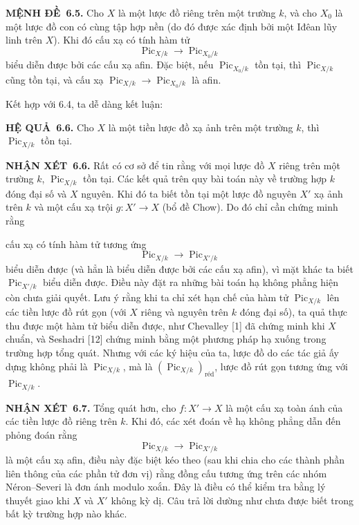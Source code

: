 \documentclass[11pt,twoside,openany]{book}
\numberwithin{equation}{section}
\newcommand{\src}[1]{%
  \phantomsection\hypertarget{src:\fgasourceid:#1}{}%
  \marginpar{\raggedleft\footnotesize\sffamily #1}%
}
\newcommand{\fgasourceid}{unset}
\newcommand{\result}[2]{\par\medskip\noindent\textbf{#1\if\relax\detokenize{#2}\relax\else\ #2\fi.}\quad}
\begin{document}
\result{MỆNH ĐỀ}{6.5} Cho $X$ là một lược đồ riêng trên một trường $k$, và cho
$X_0$ là một lược đồ con có cùng tập hợp nền (do đó được xác định bởi một Iđêan
lũy linh trên $X$). Khi đó cấu xạ có tính hàm tử
\[
\operatorname{Pic}_{X/k}\longrightarrow\operatorname{Pic}_{X_0/k}
\]
biểu diễn được bởi các cấu xạ afin. Đặc biệt, nếu
$\operatorname{Pic}_{X_0/k}$ tồn tại, thì $\operatorname{Pic}_{X/k}$ cũng tồn
tại, và cấu xạ
$\operatorname{Pic}_{X/k}\longrightarrow\operatorname{Pic}_{X_0/k}$ là afin.

Kết hợp với 6.4, ta dễ dàng kết luận:

\result{HỆ QUẢ}{6.6} Cho $X$ là một tiền lược đồ xạ ảnh trên một trường $k$,
thì $\operatorname{Pic}_{X/k}$ tồn tại.

\result{NHẬN XÉT}{6.6} Rất có cơ sở để tin rằng với mọi lược đồ $X$ riêng trên
một trường $k$, $\operatorname{Pic}_{X/k}$ tồn tại. Các kết quả trên
quy bài toán này về trường hợp $k$ đóng đại số và $X$ nguyên. Khi đó ta biết
tồn tại một lược đồ nguyên $X'$ xạ ảnh trên $k$ và một cấu xạ trội
$g:X'\longrightarrow X$ (bổ đề Chow). Do đó chỉ cần chứng minh rằng
\src{160}
cấu xạ có tính hàm tử tương ứng
\[
\operatorname{Pic}_{X/k}\longrightarrow\operatorname{Pic}_{X'/k}
\]
biểu diễn được (và hẳn là biểu diễn được bởi các cấu xạ afin), vì mặt khác ta
biết $\operatorname{Pic}_{X'/k}$ biểu diễn được. Điều này đặt ra những bài toán
hạ không phẳng hiện còn chưa giải quyết. Lưu ý rằng khi ta chỉ xét hạn chế của
hàm tử $\operatorname{Pic}_{X/k}$ lên các tiền lược đồ rút gọn (với $X$ riêng
và nguyên trên $k$ đóng đại số), ta quả thực thu được một hàm tử biểu diễn
được, như Chevalley [1] đã chứng minh khi $X$ chuẩn, và Seshadri [12] chứng minh
bằng một phương pháp hạ xuống trong trường hợp tổng quát. Nhưng với các ký hiệu
của ta, lược đồ do các tác giả ấy dựng không phải là
$\operatorname{Pic}_{X/k}$, mà là
$(\operatorname{Pic}_{X/k})_{\mathrm{réd}}$, lược đồ rút gọn tương ứng với
$\operatorname{Pic}_{X/k}$.

\result{NHẬN XÉT}{6.7} Tổng quát hơn, cho $f:X'\longrightarrow X$ là một cấu
xạ toàn ánh của các tiền lược đồ riêng trên $k$. Khi đó, các xét đoán về hạ
không phẳng dẫn đến phỏng đoán rằng
\[
\operatorname{Pic}_{X/k}\longrightarrow\operatorname{Pic}_{X'/k}
\]
là một cấu xạ afin, điều này đặc biệt kéo theo (sau khi chia cho các thành phần liên
thông của các phần tử đơn vị) rằng đồng cấu tương ứng trên các nhóm
Néron--Severi là đơn ánh modulo xoắn. Đây là điều có thể kiểm tra bằng lý thuyết
giao khi $X$ và $X'$ không kỳ dị. Câu trả lời dường như chưa được biết trong
bất kỳ trường hợp nào khác.
\end{document}
